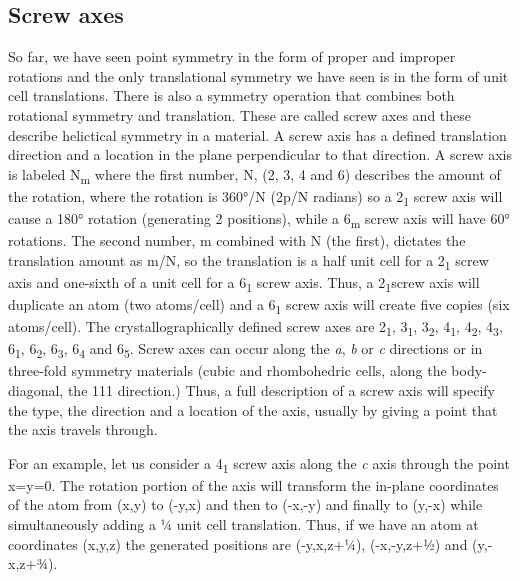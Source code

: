 \subsection{Screw axes} 
So far, we have seen point symmetry in the form of proper and improper rotations and the only translational symmetry we have seen is in the form of unit cell translations. There is also a symmetry operation that combines both rotational symmetry and translation. These are called screw axes and these describe helictical symmetry in a material. A screw axis has a defined translation direction and a location in the plane perpendicular to that direction. A screw axis is labeled N\textsubscript{m} where the first number, N, (2, 3, 4 and 6) describes the amount of the rotation, where the rotation is 360°/N (2p/N radians) so a 2\textsubscript{1} screw axis will cause a 180° rotation (generating 2 positions), while a 6\textsubscript{m }screw axis will have 60° rotations. The second number, m combined with N (the first), dictates the translation amount as m/N, so the translation is a half unit cell for a 2\textsubscript{1 }screw axis and one-sixth of a unit cell for a 6\textsubscript{1 }screw axis. Thus, a 2\textsubscript{1}screw axis will duplicate an atom (two atoms/cell) and a 6\textsubscript{1 }screw axis will create five copies (six atoms/cell). The crystallographically defined screw axes are 2\textsubscript{1}, 3\textsubscript{1}, 3\textsubscript{2}, 4\textsubscript{1}, 4\textsubscript{2}, 4\textsubscript{3}, 6\textsubscript{1}, 6\textsubscript{2}, 6\textsubscript{3}, 6\textsubscript{4} and 6\textsubscript{5}. Screw axes can occur along the \textit{a}, \textit{b} or \textit{c} directions or in three-fold symmetry materials (cubic and rhombohedric cells, along the body-diagonal, the 111 direction.) Thus, a full description of a screw axis will specify the type, the direction and a location of the axis, usually by giving a point that the axis travels through. 

 For an example, let us consider a 4\textsubscript{1} screw axis along the \textit{c} axis through the point x=y=0. The rotation portion of the axis will transform the in-plane coordinates of the atom from (x,y) to (-y,x) and then to (-x,-y) and finally to (y,-x) while simultaneously adding a ¼ unit cell translation. Thus, if we have an atom at coordinates (x,y,z) the generated positions are (-y,x,z+¼), (-x,-y,z+½) and (y,-x,z+¾).

